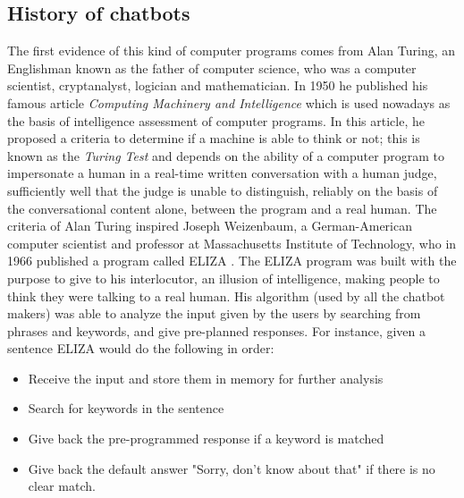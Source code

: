 \documentclass[b5paper,10pt,twoside,cucitura]{toptesi}
\begin{document}
\subsection{History of chatbots}

The first evidence of this kind of computer programs comes from Alan Turing, an Englishman known as the father of computer science, who was a computer scientist, cryptanalyst, logician and mathematician. In 1950 he published his famous article \textit{Computing Machinery and Intelligence}  \citep{turing} which is used nowadays as the basis of intelligence assessment of computer programs. In this article, he proposed a criteria to determine if a machine is able to think or not; this is known as the \textit{Turing Test} and depends on the ability of a computer program to impersonate a human in a real-time written conversation with a human judge, sufficiently well that the judge is unable to distinguish, reliably on the basis of the conversational content alone, between the program and a real human. 
The criteria of Alan Turing inspired Joseph Weizenbaum, a German-American computer scientist and professor at Massachusetts Institute of Technology, who in 1966 published a program called ELIZA  \citep{eliza}. The ELIZA program was built with the purpose to give to his interlocutor, an illusion of intelligence, making people to think they were talking to a real human. His algorithm (used by all the chatbot makers) was able to analyze the input given by the users by searching from phrases and keywords, and give pre-planned responses. For instance, given a sentence ELIZA would do the following in order:

\begin{itemize}
    \item 
    Receive the input and store them in memory for further analysis
    \item 
    Search for keywords in the sentence
    \item 
    Give back the pre-programmed response if a keyword is matched
    \item 
    Give back the default answer "Sorry, don't know about that" if there is no clear match.
\end{itemize}
\end{document}
